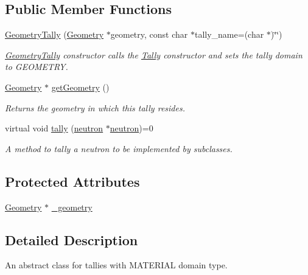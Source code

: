 \subsection*{Public Member Functions}
\begin{DoxyCompactItemize}
\item 
\hyperlink{classGeometryTally_a442edb7b6ab999650005393b5d5a3a20}{Geometry\-Tally} (\hyperlink{classGeometry}{Geometry} $\ast$geometry, const char $\ast$tally\-\_\-name=(char $\ast$)\char`\"{}\char`\"{})
\begin{DoxyCompactList}\small\item\em \hyperlink{classGeometryTally}{Geometry\-Tally} constructor calls the \hyperlink{classTally}{Tally} constructor and sets the tally domain to G\-E\-O\-M\-E\-T\-R\-Y. \end{DoxyCompactList}\item 
\hyperlink{classGeometry}{Geometry} $\ast$ \hyperlink{classGeometryTally_a4fd85a51d65e5b3edfe8931351e01d93}{get\-Geometry} ()
\begin{DoxyCompactList}\small\item\em Returns the geometry in which this tally resides. \end{DoxyCompactList}\item 
\hypertarget{classGeometryTally_a3f79423e0c1e1eb87109c6937bdfa5c8}{virtual void \hyperlink{classGeometryTally_a3f79423e0c1e1eb87109c6937bdfa5c8}{tally} (\hyperlink{structneutron}{neutron} $\ast$\hyperlink{structneutron}{neutron})=0}\label{classGeometryTally_a3f79423e0c1e1eb87109c6937bdfa5c8}

\begin{DoxyCompactList}\small\item\em A method to tally a neutron to be implemented by subclasses. \end{DoxyCompactList}\end{DoxyCompactItemize}
\subsection*{Protected Attributes}
\begin{DoxyCompactItemize}
\item 
\hyperlink{classGeometry}{Geometry} $\ast$ \hyperlink{classGeometryTally_ab2ed248e810a207e6037017a01b757f5}{\-\_\-geometry}
\end{DoxyCompactItemize}


\subsection{Detailed Description}
An abstract class for tallies with M\-A\-T\-E\-R\-I\-A\-L domain type. 

